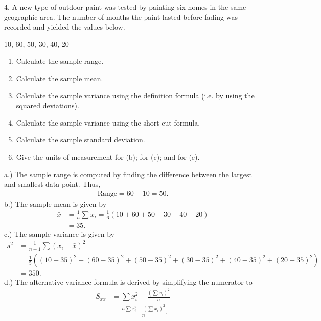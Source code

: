 \documentclass{report}
\begin{document}
    \pagebreak 
    \begin{mdframed}
        4. A new type of outdoor paint was tested by painting six homes in the same geographic
        area. The number of months the paint lasted before fading was recorded and yielded the values
        below.
        \bigbreak \noindent 
        \begin{center}
            10, 60, 50, 30, 40, 20
        \end{center}
        \begin{enumerate}[label=(\alph*)]
            \item Calculate the sample range. 
            \item Calculate the sample mean. 
            \item Calculate the sample variance using the definition formula (i.e. by using the squared deviations). 
            \item Calculate the sample variance using the short-cut formula. 
            \item Calculate the sample standard deviation. 
            \item Give the units of measurement for (b); for (c); and for (e). 
        \end{enumerate}
    \end{mdframed}
    \bigbreak \noindent 
    a.) The sample range is computed by finding the difference between the largest and smallest data point. Thus, 
    \begin{align*}
        \text{Range} = 60 - 10 = 50
    .\end{align*}
    \bigbreak \noindent 
    b.) The sample mean is given by
    \begin{align*}
        \bar{x} &= \frac{1}{n}\sum x_{i} = \frac{1}{6}(10+60+50+30+40+20) \\
        &=35
    .\end{align*}
    \bigbreak \noindent 
    c.) The sample variance is given by
    \begin{align*}
        s^{2} &= \frac{1}{n-1}\sum(x_{i} -\bar{x})^{2} \\
              &= \frac{1}{5}\left((10-35)^{2}+(60-35)^{2} +(50-35)^{2}+(30-35)^{2}+(40-35)^{2}+(20-35)^{2}\right) \\
              &=350
    .\end{align*}
    \bigbreak \noindent 
    d.)  The alternative variance formula is derived by simplifying the numerator to
    \begin{align*}
        S_{xx} &= \sum x_{i}^{2} - \frac{\left(\sum x_{i}\right)^{2}}{n} \\
        &=\frac{n\sum x_{i}^{2}- \left(\sum x_{i}\right)^{2}}{n}
    .\end{align*}
\end{document}
